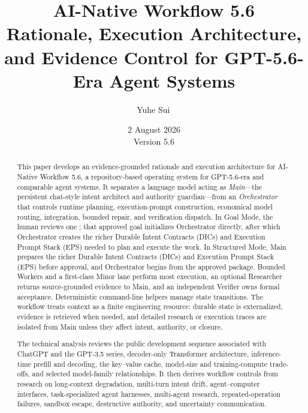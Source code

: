 \documentclass[11pt,a4paper]{article}
\title{\vspace{-8mm}\textbf{AI-Native Workflow 5.6}\\[2mm]
\large Rationale, Execution Architecture, and Evidence Control for GPT-5.6-Era Agent Systems}
\author{Yuhe Sui\,\orcidlink{0009-0002-7456-0804}}
\date{2 August 2026\\Version 5.6}
\newcommand{\code}[1]{\texttt{\detokenize{#1}}}
\begin{document}
\maketitle

\begin{abstract}
This paper develops an evidence-grounded rationale and execution architecture for AI-Native Workflow 5.6, a repository-based operating system for GPT-5.6-era and comparable agent systems. It separates a language model acting as \emph{Main}---the persistent chat-style intent architect and authority guardian---from an \emph{Orchestrator} that controls runtime planning, execution-prompt construction, economical model routing, integration, bounded repair, and verification dispatch. In Goal Mode, the human reviews one \code{GOAL.md}; that approved goal initializes Orchestrator directly, after which Orchestrator creates the richer Durable Intent Contracts (DICs) and Execution Prompt Stack (EPS) needed to plan and execute the work. In Structured Mode, Main prepares the richer Durable Intent Contracts (DICs) and Execution Prompt Stack (EPS) before approval, and Orchestrator begins from the approved package. Bounded Workers and a first-class Minor lane perform most execution, an optional Researcher returns source-grounded evidence to Main, and an independent Verifier owns formal acceptance. Deterministic command-line helpers manage state transitions. The workflow treats context as a finite engineering resource: durable state is externalized, evidence is retrieved when needed, and detailed research or execution traces are isolated from Main unless they affect intent, authority, or closure.

The technical analysis reviews the public development sequence associated with ChatGPT and the GPT-3.5 series, decoder-only Transformer architecture, inference-time prefill and decoding, the key--value cache, model-size and training-compute trade-offs, and selected model-family relationships. It then derives workflow controls from research on long-context degradation, multi-turn intent drift, agent--computer interfaces, task-specialized agent harnesses, multi-agent research, repeated-operation failures, sandbox escape, destructive authority, and uncertainty communication.


\end{abstract}
\end{document}
